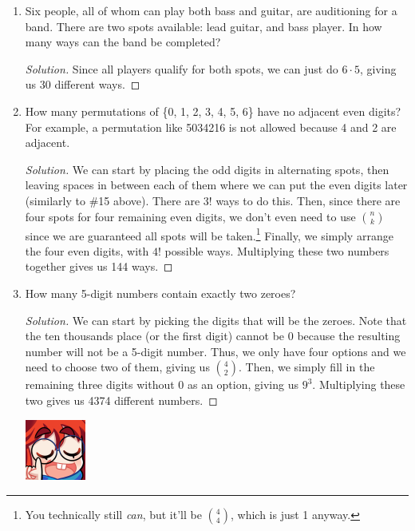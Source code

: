 \documentclass{article}
\newenvironment{solution}
  {\renewcommand\qedsymbol{$\blacksquare$}\begin{proof}[Solution]}
  {\end{proof}}
\begin{document}
\begin{enumerate}
\begin{solution}
        Finally, we arrange the girls, by $3! $. Multiplying these three numbers together gives us 1693440 ways. 
    \end{solution} 
    \item Six people, all of whom can play both bass and guitar, are auditioning for a band. There are two spots available: lead guitar, and bass player. In how many ways can the band be completed?\begin{solution} 
        Since all players qualify for both spots, we can just do $6 \cdot 5$, giving us 30 different ways. 
    \end{solution} 
    \item How many permutations of \{0, 1, 2, 3, 4, 5, 6\} have no adjacent even digits? For example, a permutation like 5034216 is not allowed because 4 and 2 are adjacent.\begin{solution} 
        We can start by placing the odd digits in alternating spots, then leaving spaces in between each of them where we can put the even digits later (similarly to \#15 above). There are $3! $ ways to do this. Then, 
        since there are four spots for four remaining even digits, we don't even need to use $\binom{n}{k}$ since we are guaranteed all spots will be taken.\footnote{You technically still \textit{can}, but it'll 
        be $\binom{4}{4}$, which is just 1 anyway.} Finally, we simply arrange the four even digits, with $4! $ possible ways. Multiplying these two numbers together gives us 144 ways. 
    \end{solution} 
    \item How many 5-digit numbers contain exactly two zeroes?\begin{solution} 
        We can start by picking the digits that will be the zeroes. Note that the ten thousands place (or the first digit) cannot be 0 because the resulting number will not be a 5-digit number. Thus, we only have 
        four options and we need to choose two of them, giving us $\binom{4}{2}$. Then, we simply fill in the remaining three digits without 0 as an option, giving us $9^3$. Multiplying these two gives us 4374 different numbers. 
    \end{solution} 
    \begin{minipage}[t]{.14\textwidth}
        \vspace{0pt}
        \includegraphics[width=2cm]{nerd_maddy.png} 

\end{minipage}
\end{enumerate}
\end{document}
